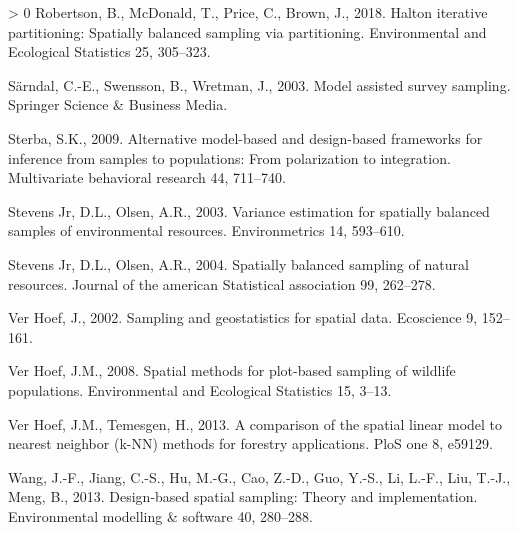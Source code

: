 \documentclass[]{elsarticle} %
\newlength{\cslhangindent}
\newenvironment{CSLReferences}[3] %
 {%
  \setlength{\parindent}{0pt}
  \ifodd #1 \everypar{\setlength{\hangindent}{\cslhangindent}}\ignorespaces\fi
  \ifnum #2 > 0
  \setlength{\parskip}{#2\baselineskip}
  \fi
 }%
 {}
\begin{document}
\begin{CSLReferences}{1}{0}
\leavevmode\hypertarget{ref-robertson2018halton}{}%
Robertson, B., McDonald, T., Price, C., Brown, J., 2018. Halton
iterative partitioning: Spatially balanced sampling via partitioning.
Environmental and Ecological Statistics 25, 305--323.

\leavevmode\hypertarget{ref-sarndal2003model}{}%
Särndal, C.-E., Swensson, B., Wretman, J., 2003. Model assisted survey
sampling. Springer Science \& Business Media.

\leavevmode\hypertarget{ref-sterba2009alternative}{}%
Sterba, S.K., 2009. Alternative model-based and design-based frameworks
for inference from samples to populations: From polarization to
integration. Multivariate behavioral research 44, 711--740.

\leavevmode\hypertarget{ref-stevens2003variance}{}%
Stevens Jr, D.L., Olsen, A.R., 2003. Variance estimation for spatially
balanced samples of environmental resources. Environmetrics 14,
593--610.

\leavevmode\hypertarget{ref-stevens2004spatially}{}%
Stevens Jr, D.L., Olsen, A.R., 2004. Spatially balanced sampling of
natural resources. Journal of the american Statistical association 99,
262--278.

\leavevmode\hypertarget{ref-verhoef2002sampling}{}%
Ver Hoef, J., 2002. Sampling and geostatistics for spatial data.
Ecoscience 9, 152--161.

\leavevmode\hypertarget{ref-verhoef2008spatial}{}%
Ver Hoef, J.M., 2008. Spatial methods for plot-based sampling of
wildlife populations. Environmental and Ecological Statistics 15, 3--13.

\leavevmode\hypertarget{ref-ver2013comparison}{}%
Ver Hoef, J.M., Temesgen, H., 2013. A comparison of the spatial linear
model to nearest neighbor (k-NN) methods for forestry applications. PloS
one 8, e59129.

\leavevmode\hypertarget{ref-wang2013design}{}%
Wang, J.-F., Jiang, C.-S., Hu, M.-G., Cao, Z.-D., Guo, Y.-S., Li, L.-F.,
Liu, T.-J., Meng, B., 2013. Design-based spatial sampling: Theory and
implementation. Environmental modelling \& software 40, 280--288.

\end{CSLReferences}
\end{document}
